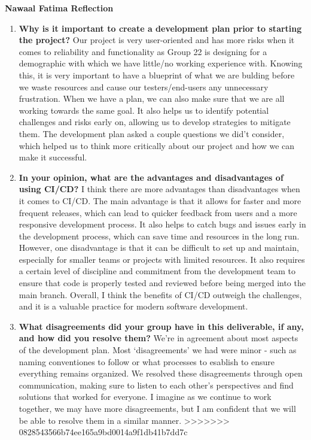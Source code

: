 \documentclass{article}
\begin{document}
\begin{enumerate}
\textbf{Nawaal Fatima Reflection}
\begin{enumerate}
    \item  \textbf{Why is it important to create a development plan prior to starting the
    project?} \newline
    Our project is very user-oriented and has more risks when it comes to reliability and functionality as Group 22 is designing for a demographic with which we have little/no working experience with.
    Knowing this, it is very important to have a blueprint of what we are bulding before we waste resources and cause our testers/end-users any unnecessary frustration. 
    When we have a plan, we can also make sure that we are all working towards the same goal. It also helps us to identify potential challenges and risks early on, allowing us to develop strategies to mitigate them.
    The development plan asked a couple questions we did't consider, which helped us to think more critically about our project and how we can make it successful.
    
    \item \textbf{In your opinion, what are the advantages and disadvantages of using
    CI/CD?} \newline
    I think there are more advantages than disadvantages when it comes to CI/CD.
    The main advantage is that it allows for faster and more frequent releases, which can lead to quicker feedback from users and a more responsive development process.
    It also helps to catch bugs and issues early in the development process, which can save time and resources in the long run.
    However, one disadvantage is that it can be difficult to set up and maintain, especially for smaller teams or projects with limited resources.
    It also requires a certain level of discipline and commitment from the development team to ensure that code is properly tested and reviewed before being merged into the main branch.
    Overall, I think the benefits of CI/CD outweigh the challenges, and it is a valuable practice for modern software development.

    \item \textbf{What disagreements did your group have in this deliverable, if any,
    and how did you resolve them?}\newline
    We're in agreement about most aspects of the development plan. Most `disagreements' we had were minor - such as naming conventiones to follow or what processes to esablish to ensure everything remains organized.
    We resolved these disagreements through open communication, making sure to listen to each other's perspectives and find solutions that worked for everyone.
    I imagine as we continue to work together, we may have more disagreements, but I am confident that we will be able to resolve them in a similar manner.
>>>>>>> 0828543566b74ee165a9bd0014a9f1db41b7dd7c
\end{enumerate}


\end{enumerate}
\end{document}
